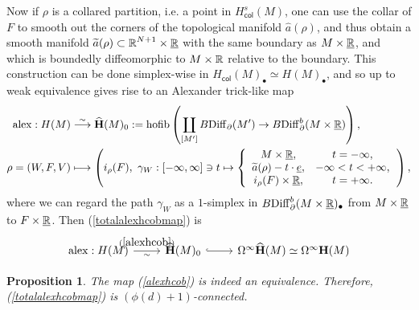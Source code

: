 \documentclass[a4paper, oneside]{amsart}
\newcommand{\diff}{\mathrm{Diff}}
\newcommand{\hofib}{\operatorname{hofib}}
\newcommand{\1}{\mathds{1}}
\newtheorem{prop}[thm]{Proposition}
\theoremstyle{remark}
\theoremstyle{definition}
\newcommand{\R}{{\scaleobj{0.97}{\mathbb{R}}}}
\newcommand{\Hsp}{\mathbf{H}}
\numberwithin{equation}{section}
\begin{document}
Now if $\rho$ is a collared partition, i.e. a point in $H_{\mathsf{col}}^s(M)$, one can use the collar of $F$ to smooth out the corners of the topological manifold $\widehat{a}(\rho)$, and thus obtain a smooth manifold $\widetilde{a}(\rho)\subset \R^{N+1}\times \underline\R$ with the same boundary as $M\times \underline\R$, and which is boundedly diffeomorphic to $M\times \R$ relative to the boundary. This construction can be done simplex-wise in $H_{\mathsf{col}}(M)_\bullet\simeq H(M)_\bullet$, and so up to weak equivalence gives rise to an Alexander trick-like map
\begin{align}
\mathrm{alex}: H(M)&\overset{\sim}\longrightarrow \widehat{\Hsp}(M)_0:=\hofib\left(\coprod_{[M']} B\diff_\partial(M')\to B\diff_\partial^b(M\times \underline{\R})\right),\label{alexhcob}\\
\rho=(W,F,V)&\longmapsto \left(i_\rho(F),\ \gamma_W: [-\infty,\infty]\ni t\mapsto \left\{\begin{array}{cc}
    M\times \underline\R, & t=-\infty, \\
    \widetilde{a}(\rho)-t\cdot\underline{e}, & -\infty<t<+\infty,\\
    i_\rho(F)\times\underline\R, & t=+\infty.
\end{array}\right.\right),\nonumber
\end{align}
where we can regard the path $\gamma_W$ as a $1$-simplex in $B\diff_\partial^b(M\times \underline{\R})_\bullet$ from $M\times \underline{\R}$ to $F\times \underline{\R}$. Then (\ref{totalalexhcobmap}) is
$$
\begin{tikzcd}
    \mathrm{alex}:H(M)\rar["(\ref{alexhcob})", "\sim"'] & \widehat{\Hsp}(M)_0\rar[hook]&\Omega^\infty\widehat{\Hsp}(M)\simeq \Omega^\infty\Hsp(M)
\end{tikzcd}
$$

\begin{prop}\label{alexequivlemma}
    The map (\ref{alexhcob}) is indeed an equivalence. Therefore, (\ref{totalalexhcobmap}) is $(\phi(d)+1)$-connected.
\end{prop}
\end{document}
